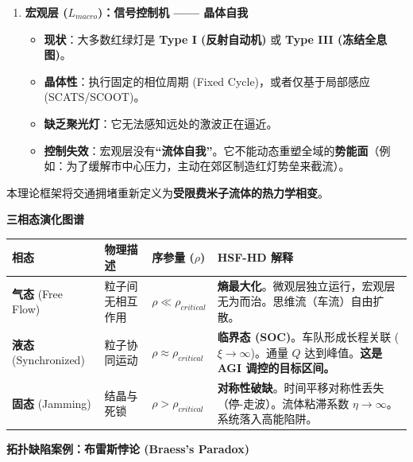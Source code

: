 \begin{enumerate}
    \item \textbf{宏观层 ($L_{macro}$)：信号控制机 —— 晶体自我}
    \begin{itemize}
        \item   \textbf{现状}：大多数红绿灯是 \textbf{Type I (反射自动机)} 或 \textbf{Type III (冻结全息图)}。
        \item   \textbf{晶体性}：执行固定的相位周期 (Fixed Cycle)，或者仅基于局部感应 (SCATS/SCOOT)。
        \item   \textbf{缺乏聚光灯}：它无法感知远处的激波正在逼近。
        \item   \textbf{控制失效}：宏观层没有\textbf{“流体自我”}。它不能动态重塑全域的\textbf{势能面}（例如：为了缓解市中心压力，主动在郊区制造红灯势垒来截流）。
    \end{itemize}
\end{enumerate}



本理论框架将交通拥堵重新定义为\textbf{受限费米子流体的热力学相变}。

\vspace{0.5em}\noindent\textbf{\textcolor{structurecolor}{三相态演化图谱}}

\begin{table}[htbp]
\centering
\begin{tabularx}{\textwidth}{l X X X}
\toprule
\rowcolor{structurecolor!20} 相态 & 物理描述 & 序参量 ($\rho$) & HSF-HD 解释 \\
\midrule
\textbf{气态} \newline (Free Flow) & 粒子间无相互作用 & $\rho \ll \rho_{critical}$ & \textbf{熵最大化}。微观层独立运行，宏观层无为而治。思维流（车流）自由扩散。 \\
\textbf{液态} \newline (Synchronized) & 粒子协同运动 & $\rho \approx \rho_{critical}$ & \textbf{临界态 (SOC)}。车队形成长程关联 ($\xi \to \infty$)。通量 $Q$ 达到峰值。\textbf{这是 AGI 调控的目标区间。} \\
\textbf{固态} \newline (Jamming) & 结晶与死锁 & $\rho > \rho_{critical}$ & \textbf{对称性破缺}。时间平移对称性丢失（停-走波）。流体粘滞系数 $\eta \to \infty$。系统落入高能陷阱。 \\
\bottomrule
\end{tabularx}
\end{table}


\vspace{0.5em}\noindent\textbf{\textcolor{structurecolor}{拓扑缺陷案例：布雷斯悖论 (Braess's Paradox)}}

